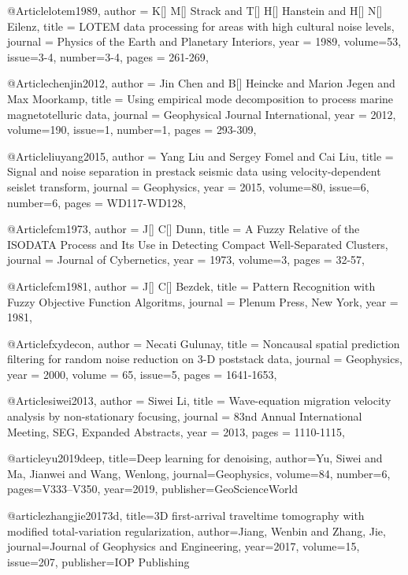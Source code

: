 @Article{lotem1989,
  author =	 { K[] M[] Strack and T[] H[] Hanstein and H[] N[] Eilenz},
  title =	 {LOTEM data processing for areas with high cultural noise levels},
  journal =	 {Physics of the Earth and Planetary Interiors},
  year =	 1989,
  volume=53,
  issue=3-4,
  number=3-4,
  pages =	 {261-269},
}

@Article{chenjin2012,
  author =	 {Jin Chen and B[] Heincke and Marion Jegen and Max Moorkamp},
  title =	 {Using empirical mode decomposition to process marine magnetotelluric data},
  journal =	 {Geophysical Journal International},
  year =	 2012,
  volume=190,
  issue=1,
  number=1,
  pages =	 {293-309},
}


@Article{liuyang2015,
  author =	 { Yang Liu and Sergey Fomel and Cai Liu},
  title =	 {Signal and noise separation in prestack seismic data using velocity-dependent seislet transform},
  journal =	 {Geophysics},
  year =	 2015,
  volume=80,
  issue=6,
  number=6,
  pages =	 {WD117-WD128},
}

@Article{fcm1973,
  author =	 { J[] C[] Dunn},
  title =	 {A Fuzzy Relative of the ISODATA Process and Its Use in Detecting Compact Well-Separated Clusters},
  journal =	 {Journal of Cybernetics},
  year =	 1973,
  volume=3,
  pages =	 {32-57},
}

@Article{fcm1981,
  author =	 { J[] C[] Bezdek},
  title =	 {Pattern Recognition with Fuzzy Objective Function Algoritms},
  journal =	 {Plenum Press, New York},
  year =	 1981,
}

@Article{fxydecon,
  author =	 {Necati Gulunay},
  title =	 {Noncausal spatial prediction filtering for random noise reduction on 3-D poststack data},
  journal =	 {Geophysics},
  year =	 2000,
  volume = 65,
  issue={5}, 
  pages =	 {1641-1653},
}	



@Article{siwei2013,
  author = 	 {Siwei Li},
  title = 	 {Wave-equation migration velocity analysis by non-stationary focusing},
  journal = 	 {83nd Annual International Meeting, SEG, Expanded Abstracts},
  year = 	 2013,
  pages =	 {1110-1115},
}

@article{yu2019deep,
  title={Deep learning for denoising},
  author={Yu, Siwei and Ma, Jianwei and Wang, Wenlong},
  journal={Geophysics},
  volume={84},
  number={6},
  pages={V333--V350},
  year={2019},
  publisher={GeoScienceWorld}
}

@article{zhangjie20173d,
  title={3{D} first-arrival traveltime tomography with modified total-variation regularization},
  author={Jiang, Wenbin and Zhang, Jie},
  journal={Journal of Geophysics and Engineering},
  year={2017},
  volume=15,
  issue=207,
  publisher={IOP Publishing}
}

